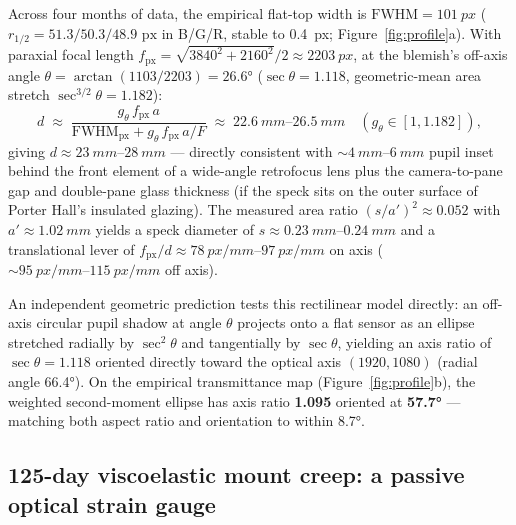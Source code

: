 \documentclass[11pt,a4paper]{article}
\begin{document}
Across four months of data, the empirical flat-top width is $\mathrm{FWHM} = \SI{101}{px}$
($r_{1/2} = 51.3 / 50.3 / 48.9\text{ px}$ in B/G/R, stable to \SI{0.4}{px};
Figure~\ref{fig:profile}a). With paraxial focal length
$f_{\mathrm{px}} = \sqrt{3840^2 + 2160^2}/2 \approx \SI{2203}{px}$, at the blemish's
off-axis angle $\theta = \arctan(1103 / 2203) = \ang{26.6}$ ($\sec\theta = 1.118$,
geometric-mean area stretch $\sec^{3/2}\theta = 1.182$):
\begin{equation}
  d \;\approx\; \frac{g_{\theta}\,f_{\mathrm{px}}\,a}{\mathrm{FWHM}_{\mathrm{px}} + g_{\theta}\,f_{\mathrm{px}}\,a/F}
    \;\approx\; \SIrange{22.6}{26.5}{mm} \quad (g_\theta \in [1, 1.182]),
\end{equation}
giving $d \approx \SIrange{23}{28}{mm}$ --- directly consistent with $\sim\SIrange{4}{6}{mm}$
pupil inset behind the front element of a wide-angle retrofocus lens plus the
camera-to-pane gap and double-pane glass thickness (if the speck sits on the outer
surface of Porter Hall's insulated glazing). The measured area ratio
$(s/a')^2 \approx 0.052$ with $a' \approx \SI{1.02}{mm}$ yields a speck diameter of
$s \approx \SIrange{0.23}{0.24}{mm}$ and a translational lever of
$f_{\mathrm{px}}/d \approx \SIrange{78}{97}{px/mm}$ on axis ($\sim\SIrange{95}{115}{px/mm}$
off axis).

An independent geometric prediction tests this rectilinear model directly: an off-axis
circular pupil shadow at angle $\theta$ projects onto a flat sensor as an ellipse
stretched radially by $\sec^2\theta$ and tangentially by $\sec\theta$, yielding an axis
ratio of $\sec\theta = 1.118$ oriented directly toward the optical axis $(1920, 1080)$
(radial angle \ang{66.4}). On the empirical transmittance map (Figure~\ref{fig:profile}b),
the weighted second-moment ellipse has axis ratio \textbf{1.095} oriented at
\textbf{\ang{57.7}} --- matching both aspect ratio and orientation to within \ang{8.7}.

\subsection{125-day viscoelastic mount creep: a passive optical strain gauge}
\end{document}
